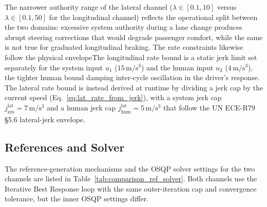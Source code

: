 \documentclass[12pt,a4paper,oneside]{report}
\begin{document}
The narrower authority range of the lateral channel ($\lambda \in [0.1, 10]$ versus $\lambda \in [0.1, 50]$ for the longitudinal channel) reflects the operational split between the two domains: excessive system authority during a lane change produces abrupt steering corrections that would degrade passenger comfort, while the same is not true for graduated longitudinal braking. The rate constraints likewise follow the physical envelopeThe longitudinal rate bound is a static jerk limit set separately for the system input $u_1$ ($15\,\mathrm{m/s^3}$) and the human input $u_2$ ($4\,\mathrm{m/s^3}$), the tighter human bound damping inter-cycle oscillation in the driver's response. The lateral rate bound is instead derived at runtime by dividing a jerk cap by the current speed (Eq.~\eqref{eq:lat_rate_from_jerk}), with a system jerk cap $j^{\text{lat}}_{\text{sys}} = 7\,\mathrm{m/s^3}$ and a human jerk cap $j^{\text{lat}}_{\text{hum}} = 5\,\mathrm{m/s^3}$ that follow the UN ECE-R79 §5.6 lateral-jerk envelope.

\subsection{References and Solver}

The reference-generation mechanisms and the OSQP solver settings for the two channels are listed in Table~\ref{tab:comparison_ref_solver}. Both channels use the Iterative Best Response loop with the same outer-iteration cap and convergence tolerance, but the inner OSQP settings differ.
\end{document}
